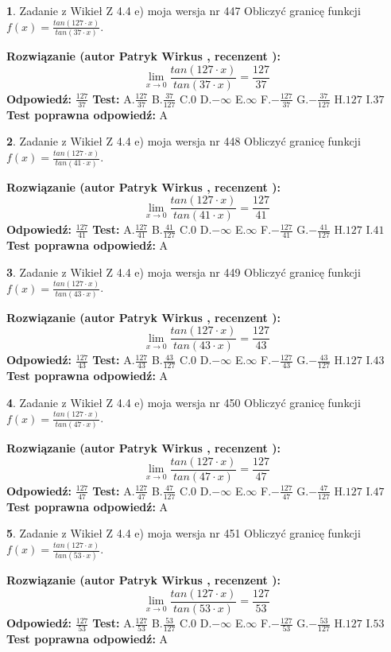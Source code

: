 \documentclass[12pt, a4paper]{article}
\theoremstyle{definition} %
\newtheorem{zad}{}
\newcommand{\zadStart}[1]{\begin{zad}#1\newline}
\newcommand{\zadStop}{\end{zad}}
\newcommand{\rozwStart}[2]{\noindent \textbf{Rozwiązanie (autor #1 , recenzent #2): }\newline}
\newcommand{\rozwStop}{\newline}
\newcommand{\odpStart}{\noindent \textbf{Odpowiedź:}\newline}
\newcommand{\odpStop}{\newline}
\newcommand{\testStart}{\noindent \textbf{Test:}\newline}
\newcommand{\testStop}{\newline}
\newcommand{\kluczStart}{\noindent \textbf{Test poprawna odpowiedź:}\newline}
\newcommand{\kluczStop}{\newline}
\begin{document}
\zadStart{Zadanie z Wikieł Z 4.4 e) moja wersja nr 447}
Obliczyć granicę funkcji $f(x)=\frac{tan(127\cdot x)}{tan(37\cdot x)}$.
\zadStop
\rozwStart{Patryk Wirkus}{}
$$\lim\limits_{x\to 0}\frac{tan(127\cdot x)}{tan(37\cdot x)}=
\frac{127}{37}$$
\rozwStop
\odpStart
$\frac{127}{37}$
\odpStop
\testStart
A.$\frac{127}{37}$
B.$\frac{37}{127}$
C.$0$
D.$-\infty$
E.$\infty$
F.$-\frac{127}{37}$
G.$-\frac{37}{127}$
H.$127$
I.$37$
\testStop
\kluczStart
A
\kluczStop



\zadStart{Zadanie z Wikieł Z 4.4 e) moja wersja nr 448}
Obliczyć granicę funkcji $f(x)=\frac{tan(127\cdot x)}{tan(41\cdot x)}$.
\zadStop
\rozwStart{Patryk Wirkus}{}
$$\lim\limits_{x\to 0}\frac{tan(127\cdot x)}{tan(41\cdot x)}=
\frac{127}{41}$$
\rozwStop
\odpStart
$\frac{127}{41}$
\odpStop
\testStart
A.$\frac{127}{41}$
B.$\frac{41}{127}$
C.$0$
D.$-\infty$
E.$\infty$
F.$-\frac{127}{41}$
G.$-\frac{41}{127}$
H.$127$
I.$41$
\testStop
\kluczStart
A
\kluczStop



\zadStart{Zadanie z Wikieł Z 4.4 e) moja wersja nr 449}
Obliczyć granicę funkcji $f(x)=\frac{tan(127\cdot x)}{tan(43\cdot x)}$.
\zadStop
\rozwStart{Patryk Wirkus}{}
$$\lim\limits_{x\to 0}\frac{tan(127\cdot x)}{tan(43\cdot x)}=
\frac{127}{43}$$
\rozwStop
\odpStart
$\frac{127}{43}$
\odpStop
\testStart
A.$\frac{127}{43}$
B.$\frac{43}{127}$
C.$0$
D.$-\infty$
E.$\infty$
F.$-\frac{127}{43}$
G.$-\frac{43}{127}$
H.$127$
I.$43$
\testStop
\kluczStart
A
\kluczStop



\zadStart{Zadanie z Wikieł Z 4.4 e) moja wersja nr 450}
Obliczyć granicę funkcji $f(x)=\frac{tan(127\cdot x)}{tan(47\cdot x)}$.
\zadStop
\rozwStart{Patryk Wirkus}{}
$$\lim\limits_{x\to 0}\frac{tan(127\cdot x)}{tan(47\cdot x)}=
\frac{127}{47}$$
\rozwStop
\odpStart
$\frac{127}{47}$
\odpStop
\testStart
A.$\frac{127}{47}$
B.$\frac{47}{127}$
C.$0$
D.$-\infty$
E.$\infty$
F.$-\frac{127}{47}$
G.$-\frac{47}{127}$
H.$127$
I.$47$
\testStop
\kluczStart
A
\kluczStop



\zadStart{Zadanie z Wikieł Z 4.4 e) moja wersja nr 451}
Obliczyć granicę funkcji $f(x)=\frac{tan(127\cdot x)}{tan(53\cdot x)}$.
\zadStop
\rozwStart{Patryk Wirkus}{}
$$\lim\limits_{x\to 0}\frac{tan(127\cdot x)}{tan(53\cdot x)}=
\frac{127}{53}$$
\rozwStop
\odpStart
$\frac{127}{53}$
\odpStop
\testStart
A.$\frac{127}{53}$
B.$\frac{53}{127}$
C.$0$
D.$-\infty$
E.$\infty$
F.$-\frac{127}{53}$
G.$-\frac{53}{127}$
H.$127$
I.$53$
\testStop
\kluczStart
A
\kluczStop
\end{document}
